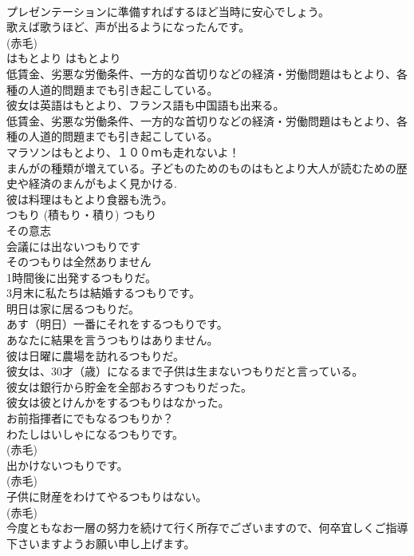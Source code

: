 \documentclass[8pt]{extreport}
\begin{document}
\begin{CJK}{UTF8}{min}
\\	プレゼンテーションに準備すればするほど当時に安心でしょう。  
\\	歌えば歌うほど、声が出るようになったんです。  
\\	(赤毛)
\\	はもとより	はもとより	
\\	低賃金、劣悪な労働条件、一方的な首切りなどの経済・労働問題はもとより、各種の人道的問題までも引き起こしている。  
\\	彼女は英語はもとより、フランス語も中国語も出来る。  
\\	低賃金、劣悪な労働条件、一方的な首切りなどの経済・労働問題はもとより、各種の人道的問題までも引き起こしている。   
\\	マラソンはもとより、１００ｍも走れないよ！  
\\	まんがの種類が増えている。子どものためのものはもとより大人が読むための歴史や経済のまんがもよく見かける.   
\\	彼は料理はもとより食器も洗う。  
\\	つもり (積もり・積り)	つもり	
\\	その意志	
\\	会議には出ないつもりです  
\\	そのつもりは全然ありません  
\\	1時間後に出発するつもりだ。  
\\	3月末に私たちは結婚するつもりです。  
\\	明日は家に居るつもりだ。  
\\	あす（明日）一番にそれをするつもりです。  
\\	あなたに結果を言うつもりはありません。  
\\	彼は日曜に農場を訪れるつもりだ。  
\\	彼女は、30才（歳）になるまで子供は生まないつもりだと言っている。  
\\	彼女は銀行から貯金を全部おろすつもりだった。  
\\	彼女は彼とけんかをするつもりはなかった。  
\\	お前指揮者にでもなるつもりか？  
\\	わたしはいしゃになるつもりです。  
\\	(赤毛)
\\	出かけないつもりです。  
\\	(赤毛)
\\	子供に財産をわけてやるつもりはない。  
\\	(赤毛)
\\	今度ともなお一層の努力を続けて行く所存でございますので、何卒宜しくご指導下さいますようお願い申し上げます。  

\end{CJK}
\end{document}
